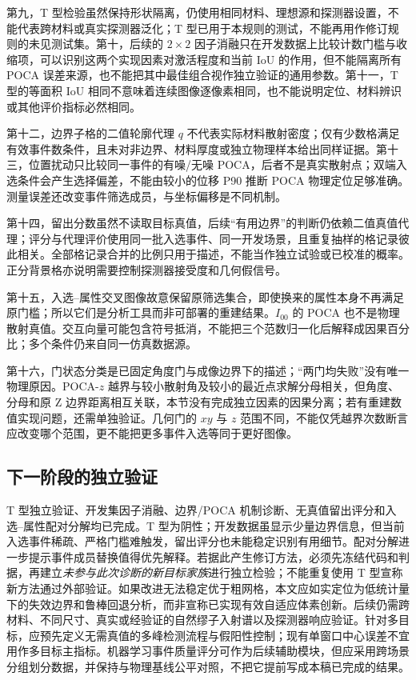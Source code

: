 \documentclass[UTF8,fontset=none,zihao=-4,a4paper]{ctexart}
\begin{document}
第九，T 型检验虽然保持形状隔离，仍使用相同材料、理想源和探测器设置，不能代表跨材料或真实探测器泛化；T 型已用于本规则的测试，不能再用作修订规则的未见测试集。第十，后续的 $2\times2$ 因子消融只在开发数据上比较计数门槛与收缩项，可以识别这两个实现因素对激活程度和当前 IoU 的作用，但不能隔离所有 POCA 误差来源，也不能把其中最佳组合视作独立验证的通用参数。第十一，T 型的等面积 IoU 相同不意味着连续图像逐像素相同，也不能说明定位、材料辨识或其他评价指标必然相同。

第十二，边界子格的二值轮廓代理 $q$ 不代表实际材料散射密度；仅有少数格满足有效事件数条件，且未对非边界、材料厚度或独立物理样本给出同样证据。第十三，位置扰动只比较同一事件的有噪/无噪 POCA，后者不是真实散射点；双端入选条件会产生选择偏差，不能由较小的位移 P90 推断 POCA 物理定位足够准确。测量误差还改变事件筛选成员，与坐标偏移是不同机制。

第十四，留出分数虽然不读取目标真值，后续“有用边界”的判断仍依赖二值真值代理；评分与代理评价使用同一批入选事件、同一开发场景，且重复抽样的格记录彼此相关。全部格记录合并的比例只用于描述，不能当作独立试验或已校准的概率。正分背景格亦说明需要控制探测器接受度和几何假信号。

第十五，入选--属性交叉图像故意保留原筛选集合，即使换来的属性本身不再满足原门槛；所以它们是分析工具而非可部署的重建结果。$I_{00}$ 的 POCA 也不是物理散射真值。交互向量可能包含符号抵消，不能把三个范数归一化后解释成因果百分比；多个条件仍来自同一仿真数据源。

第十六，门状态分类是已固定角度门与成像边界下的描述；“两门均失败”没有唯一物理原因。POCA-$z$ 越界与较小散射角及较小的最近点求解分母相关，但角度、分母和原 Z 边界距离相互关联，本节没有完成独立因素的因果分离；若有重建数值实现问题，还需单独验证。几何门的 $xy$ 与 $z$ 范围不同，不能仅凭越界次数断言应改变哪个范围，更不能把更多事件入选等同于更好图像。

\subsection{下一阶段的独立验证}
T 型独立验证、开发集因子消融、边界/POCA 机制诊断、无真值留出评分和入选--属性配对分解均已完成。T 型为阴性；开发数据虽显示少量边界信息，但当前入选事件稀疏、严格门槛难触发，留出评分也未能稳定识别有用细节。配对分解进一步提示事件成员替换值得优先解释。若据此产生修订方法，必须先冻结代码和判据，再建立\emph{未参与此次诊断的新目标家族}进行独立检验；不能重复使用 T 型宣称新方法通过外部验证。如果改进无法稳定优于粗网格，本文应如实定位为低统计量下的失效边界和鲁棒回退分析，而非宣称已实现有效自适应体素创新。后续仍需跨材料、不同尺寸、真实或经验证的自然缪子入射谱以及探测器响应验证。针对多目标，应预先定义无需真值的多峰检测流程与假阳性控制；现有单窗口中心误差不宜用作多目标主指标。机器学习事件质量评分可作为后续辅助模块，但应采用跨场景分组划分数据，并保持与物理基线公平对照，不把它提前写成本稿已完成的结果。
\end{document}
